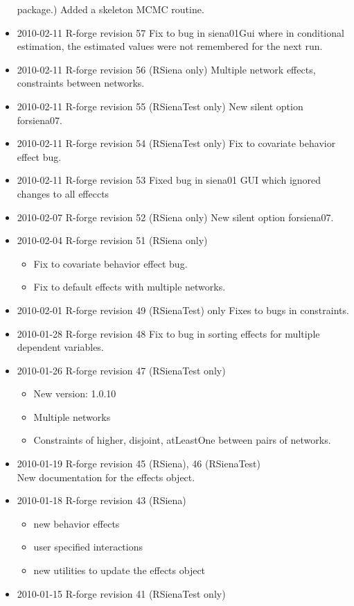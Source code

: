 \documentclass[a4paper,fleqn,11pt]{article}
\newcommand{\+}{\, + \,}
\begin{document}
\begin{small}
\begin{itemize}
  package.) Added a skeleton MCMC routine.
\item 2010-02-11 R-forge revision 57 Fix to bug in siena01Gui where in
  conditional estimation, the
  estimated values were not remembered for the next run.
\item 2010-02-11 R-forge revision 56 (RSiena only)
Multiple network effects, constraints between networks.
\item 2010-02-11 R-forge revision 55 (RSienaTest only)
New silent option for\textsf{siena07}.
\item 2010-02-11 R-forge revision 54 (RSienaTest only)
Fix to covariate behavior effect bug.
\item 2010-02-11 R-forge revision 53
Fixed bug in siena01 GUI which ignored changes to all effeccts
\item 2010-02-07 R-forge revision 52 (RSiena only)
New silent option for\textsf{siena07}.
\item 2010-02-04 R-forge revision 51 (RSiena only)
\begin{itemize}
\item
Fix to covariate behavior effect bug.
\item
Fix to default effects with multiple networks.
\end{itemize}
\item 2010-02-01 R-forge revision 49 (RSienaTest) only
Fixes to bugs in constraints.
\item 2010-01-28 R-forge revision 48
Fix to bug in sorting effects for multiple dependent variables.
\item 2010-01-26 R-forge revision 47 (RSienaTest only)
\begin{itemize}
\item New version: 1.0.10
\item Multiple networks
\item Constraints of higher, disjoint, atLeastOne between pairs of networks.
\end{itemize}
\item 2010-01-19 R-forge revision 45 (RSiena), 46 (RSienaTest)\\
 New documentation for the effects object.
\item 2010-01-18 R-forge revision 43 (RSiena)
\begin{itemize}
\item new behavior effects
\item user specified interactions
\item new utilities to update the effects object
\end{itemize}
\item 2010-01-15 R-forge revision 41 (RSienaTest only)


\end{itemize}
\end{small}
\end{document}
